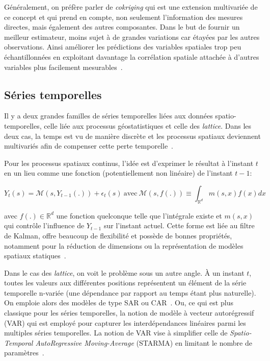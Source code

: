 Généralement, on préfère parler de \textit{cokriging} qui est une extension multivariée de ce concept et qui prend en compte, non seulement l'information des mesures directes, mais également des autres composantes. Dans le but de fournir un meilleur estimateur, moins sujet à de grandes variations car étayées par les autres observations. Ainsi améliorer les prédictions des variables spatiales trop peu échantillonnées en exploitant davantage la corrélation spatiale attachée à d'autres variables plus facilement mesurables~\cite{wackernagel2013multivariate}.

\subsection{Séries temporelles}

Il y a deux grandes familles de séries temporelles liées aux données spatio-temporelles, celle liée aux processus géostatistiques et celle des \textit{lattice}. Dans les deux cas, la temps est vu de manière discrète et les processus spatiaux deviennent multivariés afin de compenser cette perte temporelle~\cite{rouhani1990multivariate}.

Pour les processus spatiaux continus, l'idée est d'exprimer le résultat à l'instant $t$ en un lieu comme une fonction (potentiellement non linéaire) de l'instant $t - 1$:

\begin{equation}
    Y_{t}(s) = \mathcal{M}(s, Y_{t-1}(.)) + \epsilon_{t}(s) ~\text{avec}~ \mathcal{M}(s, f(.)) \equiv \int_{\mathbb{R}^{d}} m(s, x)f(x) dx
\end{equation}

avec $f(.) \in \mathbb{R}^{d}$ une fonction quelconque telle que l'intégrale existe et $m(s, x)$ qui contrôle l'influence de $Y_{t-1}$ sur l'instant actuel. Cette forme est liée au filtre de Kalman, offre beaucoup de flexibilité et possède de bonnes propriétés, notamment pour la réduction de dimensions ou la représentation de modèles spatiaux statiques~\cite{wikle1999dimension}.

Dans le cas des \textit{lattice}, on voit le problème sous un autre angle. À un instant $t$, toutes les valeurs aux différentes positions représentent un élément de la série temporelle n-variée (une dépendance par rapport au temps étant plus naturelle). On emploie alors des modèles de type SAR ou CAR~\cite{allcroft2003latent}. Ou, ce qui est plus classique pour les séries temporelles, la notion de modèle à vecteur autorégressif (VAR) qui est employé pour capturer les interdépendances linéaires parmi les multiples séries temporelles. La notion de VAR vise à simplifier celle de \textit{Spatio-Temporal AutoRegressive Moving-Average} (STARMA) en limitant le nombre de paramètres~\cite{pfeifer1980identification}.

